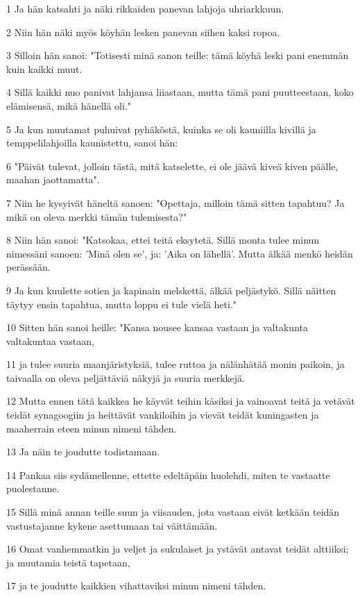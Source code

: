 \par 1 Ja hän katsahti ja näki rikkaiden panevan lahjoja uhriarkkuun.
\par 2 Niin hän näki myös köyhän lesken panevan siihen kaksi ropoa.
\par 3 Silloin hän sanoi: "Totisesti minä sanon teille: tämä köyhä leski pani enemmän kuin kaikki muut.
\par 4 Sillä kaikki nuo panivat lahjansa liiastaan, mutta tämä pani puutteestaan, koko elämisensä, mikä hänellä oli."
\par 5 Ja kun muutamat puhuivat pyhäköstä, kuinka se oli kauniilla kivillä ja temppelilahjoilla kaunistettu, sanoi hän:
\par 6 "Päivät tulevat, jolloin tästä, mitä katselette, ei ole jäävä kiveä kiven päälle, maahan jaottamatta".
\par 7 Niin he kysyivät häneltä sanoen: "Opettaja, milloin tämä sitten tapahtuu? Ja mikä on oleva merkki tämän tulemisesta?"
\par 8 Niin hän sanoi: "Katsokaa, ettei teitä eksytetä. Sillä monta tulee minun nimessäni sanoen: 'Minä olen se', ja: 'Aika on lähellä'. Mutta älkää menkö heidän perässään.
\par 9 Ja kun kuulette sotien ja kapinain melskettä, älkää peljästykö. Sillä näitten täytyy ensin tapahtua, mutta loppu ei tule vielä heti."
\par 10 Sitten hän sanoi heille: "Kansa nousee kansaa vastaan ja valtakunta valtakuntaa vastaan,
\par 11 ja tulee suuria maanjäristyksiä, tulee ruttoa ja nälänhätää monin paikoin, ja taivaalla on oleva peljättäviä näkyjä ja suuria merkkejä.
\par 12 Mutta ennen tätä kaikkea he käyvät teihin käsiksi ja vainoavat teitä ja vetävät teidät synagoogiin ja heittävät vankiloihin ja vievät teidät kuningasten ja maaherrain eteen minun nimeni tähden.
\par 13 Ja näin te joudutte todistamaan.
\par 14 Pankaa siis sydämellenne, ettette edeltäpäin huolehdi, miten te vastaatte puolestanne.
\par 15 Sillä minä annan teille suun ja viisauden, jota vastaan eivät ketkään teidän vastustajanne kykene asettumaan tai väittämään.
\par 16 Omat vanhemmatkin ja veljet ja sukulaiset ja ystävät antavat teidät alttiiksi; ja muutamia teistä tapetaan,
\par 17 ja te joudutte kaikkien vihattaviksi minun nimeni tähden.
